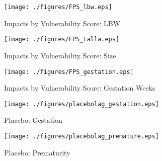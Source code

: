 \documentclass[10pt,letterpaper,subeqn]{beamer}
\begin{document}
\begin{frame}
\begin{figure}[htpb!]
  \begin{center}
  \centering
  \caption{Impacts by Vulnerability Score: LBW}
  \texttt{[image: ./figures/FPS\_lbw.eps]}
\end{center}
\end{figure}
\footnotesize{\hyperlink{FSP}{}}
\end{frame}

\begin{frame}
\begin{figure}[htpb!]
  \begin{center}
  \centering
  \caption{Impacts by Vulnerability Score: Size}
  \texttt{[image: ./figures/FPS\_talla.eps]}
\end{center}
\end{figure}
\footnotesize{\hyperlink{FSP}{}}
\end{frame}

\begin{frame}
\begin{figure}[htpb!]
  \begin{center}
  \centering
  \caption{Impacts by Vulnerability Score: Gestation Weeks}
  \texttt{[image: ./figures/FPS\_gestation.eps]}
\end{center}
\end{figure}
\footnotesize{\hyperlink{FSP}{}}
\end{frame}

\begin{frame}[label=allPlacebo]
\begin{figure}[htpb!]
  \begin{center}
  \centering
  \caption{Placebo: Gestation}
  \texttt{[image: ./figures/placebolag\_gestation.eps]}
\end{center}
\end{figure}
\footnotesize{\hyperlink{Placebo}{}}
\end{frame}

\begin{frame}
\begin{figure}[htpb!]
  \begin{center}
  \centering
  \caption{Placebo: Prematurity}
  \texttt{[image: ./figures/placebolag\_premature.eps]}
\end{center}
\end{figure}
\footnotesize{\hyperlink{Placebo}{}}
\end{frame}
\end{document}
